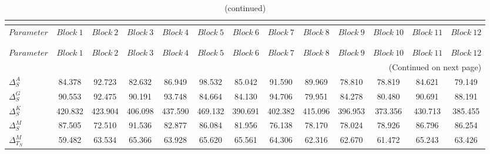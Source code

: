  
\begin{center}
\begin{longtable}{lcccccccccccc} 
\caption{MCMC Inefficiency factors per block}\\
 \label{Table:MCMC_inefficiency_factors}\\
\toprule 
$Parameter             $	 & 	 $     Block~1$	 & 	 $     Block~2$	 & 	 $     Block~3$	 & 	 $     Block~4$	 & 	 $     Block~5$	 & 	 $     Block~6$	 & 	 $     Block~7$	 & 	 $     Block~8$	 & 	 $     Block~9$	 & 	 $    Block~10$	 & 	 $    Block~11$	 & 	 $    Block~12$\\
\midrule \endfirsthead 
\caption{(continued)}\\
 \toprule \\ 
$Parameter             $	 & 	 $     Block~1$	 & 	 $     Block~2$	 & 	 $     Block~3$	 & 	 $     Block~4$	 & 	 $     Block~5$	 & 	 $     Block~6$	 & 	 $     Block~7$	 & 	 $     Block~8$	 & 	 $     Block~9$	 & 	 $    Block~10$	 & 	 $    Block~11$	 & 	 $    Block~12$\\
\midrule \endhead 
\midrule \multicolumn{13}{r}{(Continued on next page)} \\ \bottomrule \endfoot 
\bottomrule \endlastfoot 
$ {\Delta^{A}_{S}}     $	 & 	      84.378	 & 	      92.723	 & 	      82.632	 & 	      86.949	 & 	      98.532	 & 	      85.042	 & 	      91.590	 & 	      89.969	 & 	      78.810	 & 	      78.819	 & 	      84.621	 & 	      79.149 \\ 
$ {\Delta^{G}_{S}}     $	 & 	      90.553	 & 	      92.475	 & 	      90.191	 & 	      93.748	 & 	      84.664	 & 	      84.130	 & 	      94.706	 & 	      79.951	 & 	      84.278	 & 	      80.480	 & 	      90.691	 & 	      88.191 \\ 
$ {\Delta^{K}_{S}}     $	 & 	     420.832	 & 	     423.904	 & 	     406.098	 & 	     437.590	 & 	     469.132	 & 	     390.691	 & 	     402.382	 & 	     415.096	 & 	     396.953	 & 	     373.356	 & 	     430.713	 & 	     385.455 \\ 
$ {\Delta^{M}_{S}}     $	 & 	      87.505	 & 	      72.510	 & 	      91.536	 & 	      82.877	 & 	      86.084	 & 	      81.956	 & 	      76.138	 & 	      78.170	 & 	      78.024	 & 	      78.926	 & 	      86.796	 & 	      86.254 \\ 
$ {\Delta^{M}_{T_N}}   $	 & 	      59.482	 & 	      63.534	 & 	      65.366	 & 	      63.928	 & 	      65.620	 & 	      65.561	 & 	      64.306	 & 	      62.316	 & 	      62.670	 & 	      61.472	 & 	      65.243	 & 	      63.426 \\ 

\end{longtable}
\end{center}
